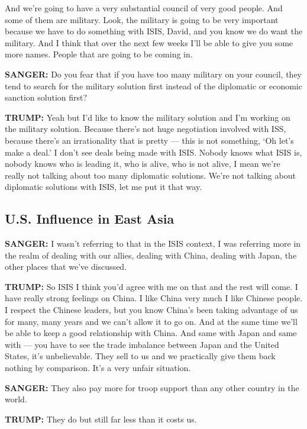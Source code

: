 And we're going to have a very substantial council of very good people.
And some of them are military. Look, the military is going to be very
important because we have to do something with ISIS, David, and you know
we do want the military. And I think that over the next few weeks I'll
be able to give you some more names. People that are going to be coming
in.

\textbf{SANGER:} Do you fear that if you have too many military on your
council, they tend to search for the military solution first instead of
the diplomatic or economic sanction solution first?

\textbf{TRUMP:} Yeah but I'd like to know the military solution and I'm
working on the military solution. Because there's not huge negotiation
involved with ISS, because there's an irrationality that is pretty ---
this is not something, `Oh let's make a deal.' I don't see deals being
made with ISIS. Nobody knows what ISIS is, nobody knows who is leading
it, who is alive, who is not alive, I mean we're really not talking
about too many diplomatic solutions. We're not talking about diplomatic
solutions with ISIS, let me put it that way.

\hypertarget{us-influence-in-east-asia}{%
\subsection{U.S. Influence in East
Asia}\label{us-influence-in-east-asia}}

\textbf{SANGER:} I wasn't referring to that in the ISIS context, I was
referring more in the realm of dealing with our allies, dealing with
China, dealing with Japan, the other places that we've discussed.

\textbf{TRUMP:} So ISIS I think you'd agree with me on that and the rest
will come. I have really strong feelings on China. I like China very
much I like Chinese people. I respect the Chinese leaders, but you know
China's been taking advantage of us for many, many years and we can't
allow it to go on. And at the same time we'll be able to keep a good
relationship with China. And same with Japan and same with --- you have
to see the trade imbalance between Japan and the United States, it's
unbelievable. They sell to us and we practically give them back nothing
by comparison. It's a very unfair situation.

\textbf{SANGER:} They also pay more for troop support than any other
country in the world.

\textbf{TRUMP:} They do but still far less than it costs us.

